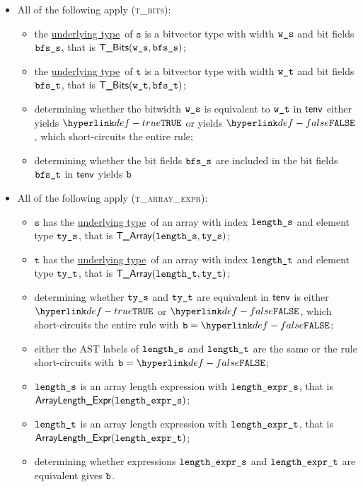 \documentclass{book}
\newcommand\ProseOrTypeError[0]{\ProseTerminateAs{\TypeErrorConfig}}
\newcommand\underlyingtype[0]{\hyperlink{def-underlyingtype}{underlying type}}
\newcommand\vt[0]{\texttt{t}}
\newcommand\vs[0]{\texttt{s}}
\begin{document}
\begin{itemize}
\item All of the following apply (\textsc{t\_bits}):
  \begin{itemize}
  \item the \underlyingtype\ of $\vs$ is a bitvector type with width $\texttt{w\_s}$ and bit fields $\texttt{bfs\_s}$, that is $\textsf{T\_Bits}(\texttt{w\_s}, \texttt{bfs\_s})$;
  \item the \underlyingtype\ of $\vt$ is a bitvector type with width $\texttt{w\_t}$ and bit fields $\texttt{bfs\_t}$, that is $\textsf{T\_Bits}(\texttt{w\_t}, \texttt{bfs\_t})$;
  \item determining whether the bitwidth $\texttt{w\_s}$ is equivalent to $\texttt{w\_t}$ in $\textsf{tenv}$ either yields $\True$ or yields $\False$,
        which short-circuits the entire rule;
  \item determining whether the bit fields $\texttt{bfs\_s}$ are included in the bit fields $\texttt{bfs\_t}$ in $\textsf{tenv}$ yields $\texttt{b}$\ProseOrTypeError
  \end{itemize}

\item All of the following apply (\textsc{t\_array\_expr}):
  \begin{itemize}
  \item $\vs$ has the \underlyingtype\ of an array with index $\texttt{length\_s}$ and element type $\texttt{ty\_s}$, that is $\textsf{T\_Array}(\texttt{length\_s}, \texttt{ty\_s})$;
  \item $\vt$ has the \underlyingtype\ of an array with index $\texttt{length\_t}$ and element type $\texttt{ty\_t}$, that is $\textsf{T\_Array}(\texttt{length\_t}, \texttt{ty\_t})$;
  \item determining whether $\texttt{ty\_s}$ and $\texttt{ty\_t}$ are equivalent in $\textsf{tenv}$ is either $\True$
  or $\False$, which short-circuits the entire rule with $\vb=\False$;
  \item either the AST labels of $\texttt{length\_s}$ and $\texttt{length\_t}$ are the same or the rule short-circuits with $\vb=\False$;
  \item $\texttt{length\_s}$ is an array length expression with $\texttt{length\_expr\_s}$, that is \\ $\textsf{ArrayLength\_Expr}(\texttt{length\_expr\_s})$;
  \item $\texttt{length\_t}$ is an array length expression with $\texttt{length\_expr\_t}$, that is \\ $\textsf{ArrayLength\_Expr}(\texttt{length\_expr\_t})$;
  \item determining whether expressions $\texttt{length\_expr\_s}$ and $\texttt{length\_expr\_t}$ are equivalent gives $\texttt{b}$.
  \end{itemize}


\end{itemize}
\end{document}
